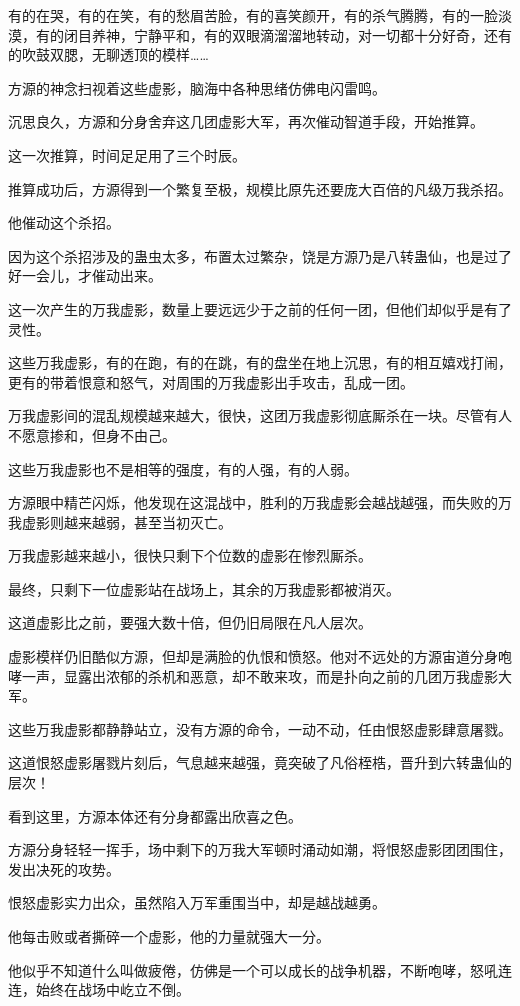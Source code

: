 \begin{this_body}
有的在哭，有的在笑，有的愁眉苦脸，有的喜笑颜开，有的杀气腾腾，有的一脸淡漠，有的闭目养神，宁静平和，有的双眼滴溜溜地转动，对一切都十分好奇，还有的吹鼓双腮，无聊透顶的模样……

方源的神念扫视着这些虚影，脑海中各种思绪仿佛电闪雷鸣。

沉思良久，方源和分身舍弃这几团虚影大军，再次催动智道手段，开始推算。

这一次推算，时间足足用了三个时辰。

推算成功后，方源得到一个繁复至极，规模比原先还要庞大百倍的凡级万我杀招。

他催动这个杀招。

因为这个杀招涉及的蛊虫太多，布置太过繁杂，饶是方源乃是八转蛊仙，也是过了好一会儿，才催动出来。

这一次产生的万我虚影，数量上要远远少于之前的任何一团，但他们却似乎是有了灵性。

这些万我虚影，有的在跑，有的在跳，有的盘坐在地上沉思，有的相互嬉戏打闹，更有的带着恨意和怒气，对周围的万我虚影出手攻击，乱成一团。

万我虚影间的混乱规模越来越大，很快，这团万我虚影彻底厮杀在一块。尽管有人不愿意掺和，但身不由己。

这些万我虚影也不是相等的强度，有的人强，有的人弱。

方源眼中精芒闪烁，他发现在这混战中，胜利的万我虚影会越战越强，而失败的万我虚影则越来越弱，甚至当初灭亡。

万我虚影越来越小，很快只剩下个位数的虚影在惨烈厮杀。

最终，只剩下一位虚影站在战场上，其余的万我虚影都被消灭。

这道虚影比之前，要强大数十倍，但仍旧局限在凡人层次。

虚影模样仍旧酷似方源，但却是满脸的仇恨和愤怒。他对不远处的方源宙道分身咆哮一声，显露出浓郁的杀机和恶意，却不敢来攻，而是扑向之前的几团万我虚影大军。

这些万我虚影都静静站立，没有方源的命令，一动不动，任由恨怒虚影肆意屠戮。

这道恨怒虚影屠戮片刻后，气息越来越强，竟突破了凡俗桎梏，晋升到六转蛊仙的层次！

看到这里，方源本体还有分身都露出欣喜之色。

方源分身轻轻一挥手，场中剩下的万我大军顿时涌动如潮，将恨怒虚影团团围住，发出决死的攻势。

恨怒虚影实力出众，虽然陷入万军重围当中，却是越战越勇。

他每击败或者撕碎一个虚影，他的力量就强大一分。

他似乎不知道什么叫做疲倦，仿佛是一个可以成长的战争机器，不断咆哮，怒吼连连，始终在战场中屹立不倒。


\end{this_body}
